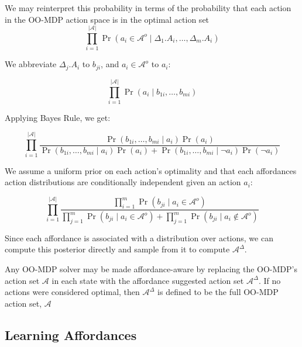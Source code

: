 \documentclass[conference]{IEEEtran}
\begin{document}
We may reinterpret this probability in terms of the probability that each action in the OO-MDP action space is in the optimal action set
\begin{equation}
\prod_{i=1}^{|\mathcal{A}|}\Pr(a_i \in \mathcal{A}^o \mid \Delta_1.A_i, \ldots, \Delta_m.A_i)
\end{equation}

We abbreviate $\Delta_j.A_i$ to $b_{ji}$, and $a_i \in \mathcal{A}^o$ to $a_i$:

\begin{equation}
\prod_{i=1}^{|\mathcal{A}|}\Pr(a_i \mid b_{1i}, \ldots, b_{mi})
\end{equation}

Applying Bayes Rule, we get:

\begin{equation}
\prod_{i=1}^{|\mathcal{A}|} \frac{\Pr(b_{1i}, \ldots, b_{mi} \mid a_i) \Pr(a_i)}{\Pr(b_{1i}, \ldots, b_{mi} \mid a_i) \Pr(a_i) + \Pr(b_{1i}, \ldots, b_{mi} \mid \neg a_i) \Pr(\neg a_i)}
\end{equation}

We assume a uniform prior on each action's optimality and that each affordances action distributions are conditionally independent given an action $a_i$:

\begin{equation}
\prod_{i=1}^{|\mathcal{A}|} \frac{\prod_{i=1}^m \Pr(b_{ji} \mid a_i \in \mathcal{A}^o)}{\prod_{j=1}^m\Pr(b_{ji} \mid a_i \in \mathcal{A}^o) + \prod_{j=1}^m\Pr(b_{ji} \mid a_i \not\in \mathcal{A}^o)}
\label{eq:posterior}
\end{equation}

Since each affordance is associated with a distribution over actions, we can compute this posterior directly and sample from it
to compute $\mathcal{A}^\Delta$.

Any OO-MDP solver may be made affordance-aware by replacing the 
OO-MDP's action set $\mathcal{A}$ in each state with the affordance 
suggested action set $\mathcal{A}^\Delta$. If no actions were considered optimal,
then $\mathcal{A}^\Delta$ is defined to be the full OO-MDP action set, $\mathcal{A}$

\subsection{Learning Affordances}
\end{document}
